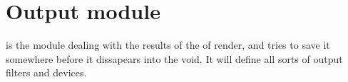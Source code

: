 % 

\chapter{Output module}

 is the module dealing with the results of the of render, and tries to save it somewhere before it dissapears into the void.  It will define all sorts of output filters and devices.